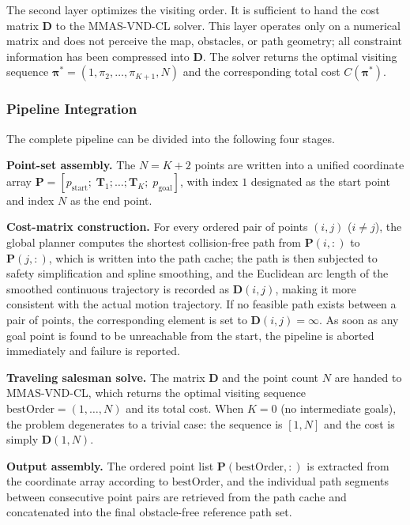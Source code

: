 The second layer optimizes the visiting order. It is sufficient to hand the cost matrix $\mathbf{D}$ to the MMAS-VND-CL solver. This layer operates only on a numerical matrix and does not perceive the map, obstacles, or path geometry; all constraint information has been compressed into $\mathbf{D}$. The solver returns the optimal visiting sequence $\bm{\pi}^{*} = (1, \pi_2, \dots, \pi_{K+1}, N)$ and the corresponding total cost $C(\bm{\pi}^{*})$.

\subsubsection{Pipeline Integration}

The complete pipeline can be divided into the following four stages.

\textbf{Point-set assembly.} The $N = K + 2$ points are written into a unified coordinate array $\mathbf{P} = [p_{\mathrm{start}};\; \mathbf{T}_1; \dots; \mathbf{T}_K;\; p_{\mathrm{goal}}]$, with index $1$ designated as the start point and index $N$ as the end point.

\textbf{Cost-matrix construction.} For every ordered pair of points $(i, j)$ ($i \neq j$), the global planner computes the shortest collision-free path from $\mathbf{P}(i,:)$ to $\mathbf{P}(j,:)$, which is written into the path cache; the path is then subjected to safety simplification and spline smoothing, and the Euclidean arc length of the smoothed continuous trajectory is recorded as $\mathbf{D}(i, j)$, making it more consistent with the actual motion trajectory. If no feasible path exists between a pair of points, the corresponding element is set to $\mathbf{D}(i, j) = \infty$. As soon as any goal point is found to be unreachable from the start, the pipeline is aborted immediately and failure is reported.

\textbf{Traveling salesman solve.} The matrix $\mathbf{D}$ and the point count $N$ are handed to MMAS-VND-CL, which returns the optimal visiting sequence $\mathrm{bestOrder} = (1, \dots, N)$ and its total cost. When $K = 0$ (no intermediate goals), the problem degenerates to a trivial case: the sequence is $[1, N]$ and the cost is simply $\mathbf{D}(1, N)$.

\textbf{Output assembly.} The ordered point list $\mathbf{P}(\mathrm{bestOrder}, :)$ is extracted from the coordinate array according to $\mathrm{bestOrder}$, and the individual path segments between consecutive point pairs are retrieved from the path cache and concatenated into the final obstacle-free reference path set.

